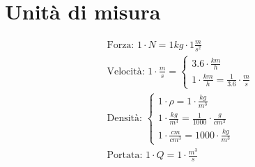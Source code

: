 \section{Unità di misura}

\begin{gather*}
  \text{Forza: } 1 \cdot N = 1kg \cdot 1 \frac{m}{s^2} \\
  \text{Velocità: } 1 \cdot \frac{m}{s} = \begin{cases}
    3.6 \cdot \frac{km}{h} \\
1   \cdot \frac{km}{h} = \frac{1}{3.6} \cdot \frac{m}{s}
  \end{cases} \\
  \text{Densità: } \begin{cases}
    1 \cdot \rho = 1 \cdot \frac{kg}{m^3} \\
    1 \cdot \frac{kg}{m^3} = \frac{1}{1000} \cdot \frac{g}{cm^3} \\
    1 \cdot \frac{cm}{cm^3} = 1000 \cdot \frac{kg}{m^3}
  \end{cases} \\
  \text{Portata: } 1 \cdot Q = 1 \cdot \frac{m^3}{s}
\end{gather*}